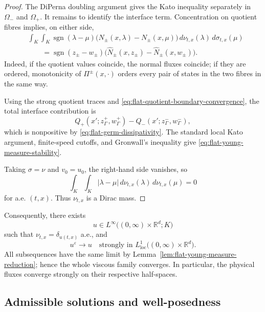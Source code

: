\documentclass[11pt]{amsart}
\numberwithin{equation}{section}
\theoremstyle{plain}
\theoremstyle{definition}
\theoremstyle{remark}
\begin{document}
\begin{proof}
The DiPerna doubling argument gives the Kato inequality separately in
\(\Omega_-\) and \(\Omega_+\). It remains to identify the interface term.
Concentration on quotient fibres implies, on either side,
\begin{equation}
\label{eq:flat-young-normal-kato-flux}
\begin{aligned}
&\int_K\int_K
    \operatorname{sgn}(\lambda-\mu)
    \bigl(N_\pm(x,\lambda)-N_\pm(x,\mu)\bigr)
\,d\nu_{t,x}(\lambda)
\,d\sigma_{t,x}(\mu)
\\
&\qquad=
\operatorname{sgn}(z_\pm-w_\pm)
\bigl(
    \widehat N_\pm(x,z_\pm)
    -
    \widehat N_\pm(x,w_\pm)
\bigr).
\end{aligned}
\end{equation}
Indeed, if the quotient values coincide, the normal fluxes coincide; if they
are ordered, monotonicity of \(\Pi^\pm(x,\cdot)\) orders every pair of states
in the two fibres in the same way.

Using the strong quotient traces and
\eqref{eq:flat-quotient-boundary-convergence}, the total interface
contribution is
\[
    Q_+(x';z^+_\Gamma,w^+_\Gamma)
    -
    Q_-(x';z^-_\Gamma,w^-_\Gamma),
\]
which is nonpositive by
\eqref{eq:flat-germ-dissipativity}. The standard local Kato argument,
finite-speed cutoffs, and Gronwall's inequality give
\eqref{eq:flat-young-measure-stability}.

Taking \(\sigma=\nu\) and \(v_0=u_0\), the right-hand side vanishes, so
\[
    \int_K\int_K|\lambda-\mu|
    \,d\nu_{t,x}(\lambda)
    \,d\nu_{t,x}(\mu)
    =0
\]
for a.e. \((t,x)\). Thus \(\nu_{t,x}\) is a Dirac mass.
\end{proof}

Consequently, there exists
\[
    u\in L^\infty
    \bigl((0,\infty)\times\mathbb R^d;K\bigr)
\]
such that \(\nu_{t,x}=\delta_{u(t,x)}\) a.e., and
\begin{equation}
\label{eq:flat-strong-convergence-state}
    u^\varepsilon
    \longrightarrow u
    \quad\text{strongly in }
    L^1_{\mathrm{loc}}
    \bigl((0,\infty)\times\mathbb R^d\bigr).
\end{equation}
All subsequences have the same limit by
Lemma~\ref{lem:flat-young-measure-reduction}; hence the whole viscous family
converges. In particular, the physical fluxes converge strongly on their
respective half-spaces.

\subsection{Admissible solutions and well-posedness}
\label{subsec:flat-admissible-wellposedness}
\end{document}

